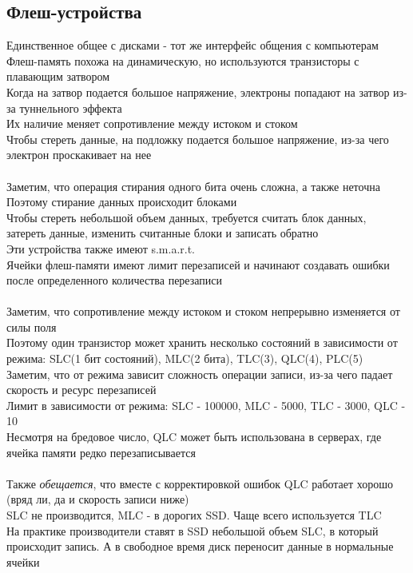 \documentclass[12pt]{article}
\begin{document}
\subsection{Флеш-устройства}
Единственное общее с дисками - тот же интерфейс общения с компьютерам\\
Флеш-память похожа на динамическую, но используются транзисторы с плавающим затвором\\
Когда на затвор подается большое напряжение, электроны попадают на затвор из-за туннельного эффекта\\
Их наличие меняет сопротивление между истоком и стоком\\
Чтобы стереть данные, на подложку подается большое напряжение, из-за чего электрон проскакивает на нее\\\\
Заметим, что операция стирания одного бита очень сложна, а также неточна\\
Поэтому стирание данных происходит блоками\\
Чтобы стереть небольшой объем данных, требуется считать блок данных, затереть данные, изменить считанные блоки и записать обратно\\
Эти устройства также имеют s.m.a.r.t.\\
Ячейки флеш-памяти имеют лимит перезаписей и начинают создавать ошибки после определенного количества перезаписи\\\\
Заметим, что сопротивление между истоком и стоком непрерывно изменяется от силы поля\\
Поэтому один транзистор может хранить несколько состояний в зависимости от режима: SLC(1 бит состояний), MLC(2 бита), TLC(3), QLC(4), PLC(5)\\
Заметим, что от режима зависит сложность операции записи, из-за чего падает скорость и ресурс перезаписей\\
Лимит в зависимости от режима: SLC - 100000, MLC - 5000, TLC - 3000, QLC - 10\\
Несмотря на бредовое число, QLC может быть использована в серверах, где ячейка памяти редко перезаписывается\\\\
Также \textit{обещается}, что вместе с корректировкой ошибок QLC работает хорошо (вряд ли, да и скорость записи ниже)\\
SLC не производится, MLC - в дорогих SSD. Чаще всего используется TLC\\
На практике производители ставят в SSD небольшой объем SLC, в который происходит запись. А в свободное время диск переносит данные в нормальные ячейки\\
\end{document}
